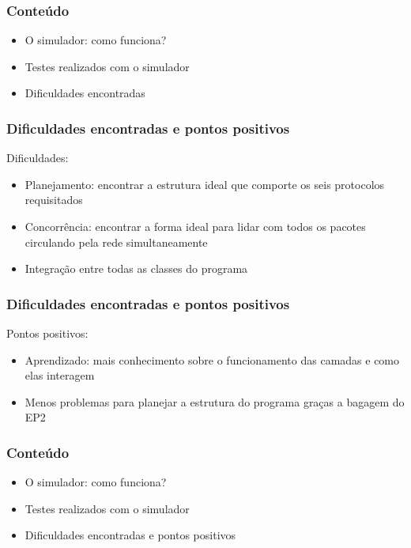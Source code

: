 \documentclass{beamer}
\begin{document}
\begin{frame}
	\frametitle{Conteúdo}
	\begin{itemize}
		\item \textcolor{covered}{O simulador: como funciona?}
		\item \textcolor{covered}{Testes realizados com o simulador}
		\item Dificuldades encontradas
	\end{itemize}
\end{frame}

\begin{frame}
	\frametitle{Dificuldades encontradas e pontos positivos}
	Dificuldades:
	\begin{itemize}
		\item Planejamento: encontrar a estrutura ideal que comporte os seis protocolos requisitados
		\item Concorrência: encontrar a forma ideal para lidar com todos os pacotes circulando pela rede simultaneamente
		\item Integração entre todas as classes do programa
	\end{itemize}
\end{frame}

\begin{frame}
	\frametitle{Dificuldades encontradas e pontos positivos}
	Pontos positivos:
	\begin{itemize}
		\item Aprendizado: mais conhecimento sobre o funcionamento das camadas e como elas interagem
		\item Menos problemas para planejar a estrutura do programa graças a bagagem do EP2
	\end{itemize}
\end{frame}

\begin{frame}
	\frametitle{Conteúdo}
	\begin{itemize}
		\item \textcolor{covered}{O simulador: como funciona?}
		\item \textcolor{covered}{Testes realizados com o simulador}
		\item \textcolor{covered}{Dificuldades encontradas e pontos positivos}
	\end{itemize}
\end{frame}
\end{document}
